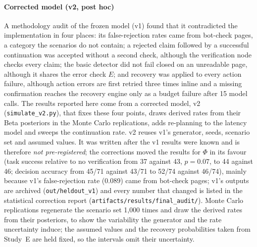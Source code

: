 \paragraph{Corrected model (v2, post hoc)} A methodology audit of the frozen model (v1) found that it contradicted the implementation in four places: its false-rejection rates came from bot-check pages, a category the scenarios do not contain; a rejected claim followed by a successful continuation was accepted without a second check, although the verification node checks every claim; the basic detector did not fail closed on an unreadable page, although it shares the error check $E$; and recovery was applied to every action failure, although action errors are first retried three times inline and a missing confirmation reaches the recovery engine only as a budget failure after 15 model calls. The results reported here come from a corrected model, v2 (\texttt{simulate\_v2.py}), that fixes these four points, draws derived rates from their Beta posteriors in the Monte Carlo replications, adds re-planning to the latency model and sweeps the continuation rate. v2 reuses v1's generator, seeds, scenario set and assumed values. It was written after the v1 results were known and is therefore \emph{not pre-registered}; the corrections moved the results for $\Phi$ in its favour (task success relative to no verification from 37 against 43, $p=0.07$, to 44 against 46; decision accuracy from 45/71 against 43/71 to 52/74 against 46/74), mainly because v1's false-rejection rate (0.089) came from bot-check pages; v1's outputs are archived (\texttt{out/heldout\_v1}) and every number that changed is listed in the statistical correction report (\texttt{artifacts/results/final\_audit/}). Monte Carlo replications regenerate the scenario set 1{,}000 times and draw the derived rates from their posteriors, to show the variability the generator and the rate uncertainty induce; the assumed values and the recovery probabilities taken from Study~E are held fixed, so the intervals omit their uncertainty.

